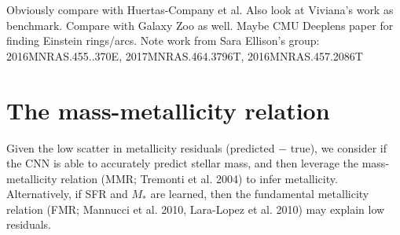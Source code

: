 \documentclass[fleqn,usenatbib]{mnras}
\begin{document}
Obviously compare with Huertas-Company et al.
Also look at Viviana's work as benchmark.
Compare with Galaxy Zoo as well.
Maybe CMU Deeplens paper for finding Einstein rings/arcs.
Note work from Sara Ellison's group: 
2016MNRAS.455..370E, 2017MNRAS.464.3796T, 2016MNRAS.457.2086T 



%
%

\section{The mass-metallicity relation} \label{MMR}
Given the low scatter in metallicity residuals (predicted $-$ true), we consider if the CNN is able to accurately predict stellar mass, and then leverage the mass-metallicity relation (MMR; Tremonti et al. 2004) to infer metallicity.
Alternatively, if SFR and $M_*$ are learned, then the fundamental metallicity relation (FMR; Mannucci et al. 2010, Lara-Lopez et al. 2010) may explain low residuals.
\end{document}
